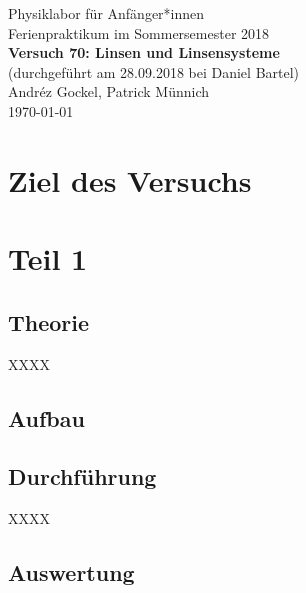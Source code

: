 \documentclass[11pt,a4paper]{article}
\newcommand{\halftime}[4]{\begin{figure}[h]
\begin{minipage}{.#1\textwidth}#3\end{minipage}\begin{minipage}{.#2\textwidth}
\centering
#4\end{minipage}
\end{figure}}
\begin{document}
{
\centering 
\large 
Physiklabor für Anf\"anger*innen \\
Ferienpraktikum im Sommersemester 2018 \\[4mm]
\textbf{\LARGE 
Versuch 70: Linsen und Linsensysteme
} \\[3mm]
(durchgef\"uhrt am 28.09.2018 bei Daniel Bartel) \\
Andréz Gockel, Patrick M\"unnich\\
\today \\[10mm]
}

\vspace{50pt}
\tableofcontents
\vspace{22pt}
\listoftables
\vspace{22pt}
\listoffigures
\pagebreak

\section{Ziel des Versuchs}



\section{Teil 1}

\subsection{Theorie}

XXXX

\subsection{Aufbau}



\subsection{Durchführung}

XXXX

\subsection{Auswertung}
\end{document}
